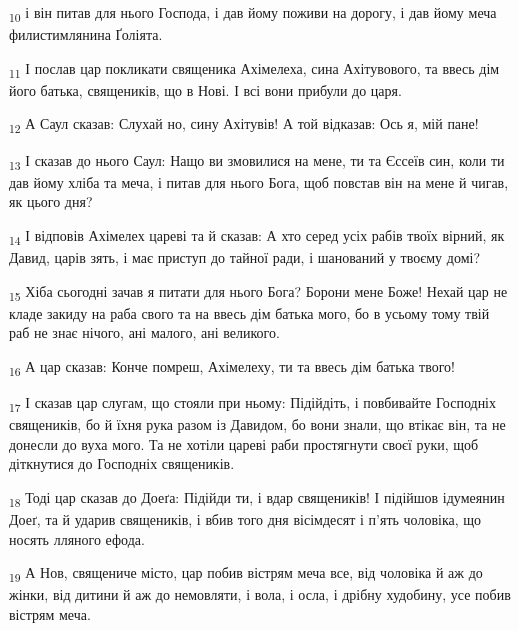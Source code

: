 \begin{tcolorbox}
\textsubscript{10} і він питав для нього Господа, і дав йому поживи на дорогу, і дав йому меча филистимлянина Ґоліята.
\end{tcolorbox}
\begin{tcolorbox}
\textsubscript{11} І послав цар покликати священика Ахімелеха, сина Ахітувового, та ввесь дім його батька, священиків, що в Нові. І всі вони прибули до царя.
\end{tcolorbox}
\begin{tcolorbox}
\textsubscript{12} А Саул сказав: Слухай но, сину Ахітувів! А той відказав: Ось я, мій пане!
\end{tcolorbox}
\begin{tcolorbox}
\textsubscript{13} І сказав до нього Саул: Нащо ви змовилися на мене, ти та Єссеїв син, коли ти дав йому хліба та меча, і питав для нього Бога, щоб повстав він на мене й чигав, як цього дня?
\end{tcolorbox}
\begin{tcolorbox}
\textsubscript{14} І відповів Ахімелех цареві та й сказав: А хто серед усіх рабів твоїх вірний, як Давид, царів зять, і має приступ до тайної ради, і шанований у твоєму домі?
\end{tcolorbox}
\begin{tcolorbox}
\textsubscript{15} Хіба сьогодні зачав я питати для нього Бога? Борони мене Боже! Нехай цар не кладе закиду на раба свого та на ввесь дім батька мого, бо в усьому тому твій раб не знає нічого, ані малого, ані великого.
\end{tcolorbox}
\begin{tcolorbox}
\textsubscript{16} А цар сказав: Конче помреш, Ахімелеху, ти та ввесь дім батька твого!
\end{tcolorbox}
\begin{tcolorbox}
\textsubscript{17} І сказав цар слугам, що стояли при ньому: Підійдіть, і повбивайте Господніх священиків, бо й їхня рука разом із Давидом, бо вони знали, що втікає він, та не донесли до вуха мого. Та не хотіли цареві раби простягнути своєї руки, щоб діткнутися до Господніх священиків.
\end{tcolorbox}
\begin{tcolorbox}
\textsubscript{18} Тоді цар сказав до Доеґа: Підійди ти, і вдар священиків! І підійшов ідумеянин Доеґ, та й ударив священиків, і вбив того дня вісімдесят і п'ять чоловіка, що носять лляного ефода.
\end{tcolorbox}
\begin{tcolorbox}
\textsubscript{19} А Нов, священиче місто, цар побив вістрям меча все, від чоловіка й аж до жінки, від дитини й аж до немовляти, і вола, і осла, і дрібну худобину, усе побив вістрям меча.
\end{tcolorbox}
